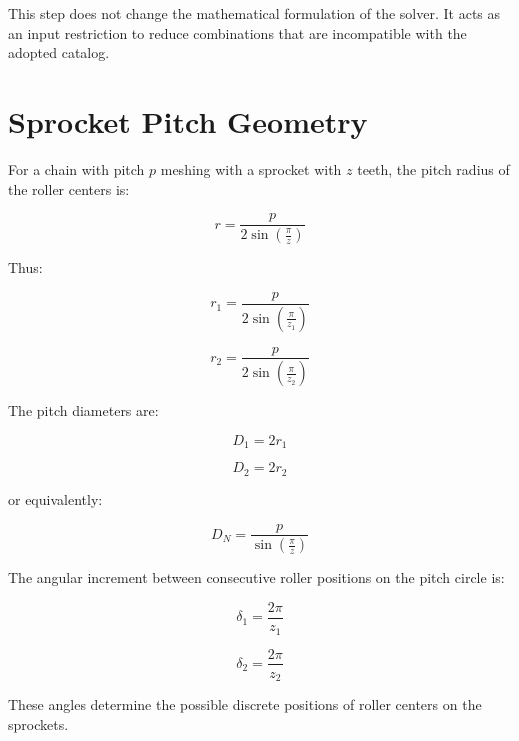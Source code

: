 \documentclass[12pt,a4paper]{article}
\begin{document}
This step does not change the mathematical formulation of the solver. It acts as an input restriction to reduce combinations that are incompatible with the adopted catalog.

\section{Sprocket Pitch Geometry}

For a chain with pitch $p$ meshing with a sprocket with $z$ teeth, the pitch radius of the roller centers is:

\begin{equation}
r = \frac{p}{2\sin\left(\frac{\pi}{z}\right)}
\end{equation}

Thus:

\begin{equation}
r_1 = \frac{p}{2\sin\left(\frac{\pi}{z_1}\right)}
\end{equation}

\begin{equation}
r_2 = \frac{p}{2\sin\left(\frac{\pi}{z_2}\right)}
\end{equation}

The pitch diameters are:

\begin{equation}
D_1 = 2r_1
\end{equation}

\begin{equation}
D_2 = 2r_2
\end{equation}

or equivalently:

\begin{equation}
D_N = \frac{p}{\sin\left(\frac{\pi}{z}\right)}
\end{equation}

The angular increment between consecutive roller positions on the pitch circle is:

\begin{equation}
\delta_1 = \frac{2\pi}{z_1}
\end{equation}

\begin{equation}
\delta_2 = \frac{2\pi}{z_2}
\end{equation}

These angles determine the possible discrete positions of roller centers on the sprockets.
\end{document}
